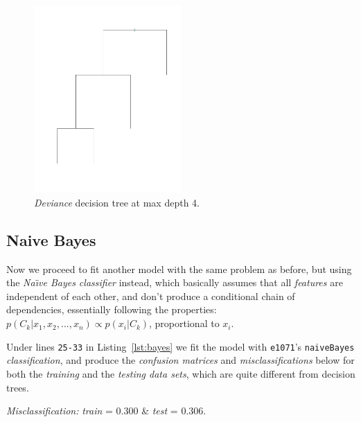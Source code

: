 \documentclass[a4paper, twocolumn]{article}
\begin{document}
    \begin{figure}[h!]
		\includegraphics[width=0.5\textwidth]{share/best_subtree.png}  
		\caption{\textit{Deviance} decision tree at max depth 4.\label{fig:best_subtree}}
	\end{figure}

	\subsection{Naive Bayes}

        Now we proceed to fit another model with the same problem as before, but using the \emph{Na{\"\i}ve Bayes classifier} instead, which basically assumes that all \emph{features} are independent of each other, and don't produce a conditional chain of dependencies, essentially following the properties: $p(C_k | x_1, x_2, ..., x_n) \propto p(x_i | C_k)$, proportional to $x_i$.

        Under lines \texttt{25-33} in Listing~\ref{lst:bayes} we fit the model with \texttt{e1071}'s \texttt{naiveBayes} \emph{classification}, and produce the \emph{confusion matrices} and \emph{misclassifications} below for both the \emph{training} and the \emph{testing data sets}, which are quite different from decision trees.

        \emph{Misclassification:} \emph{train} = 0.300 \& \emph{test} = 0.306.
\end{document}
